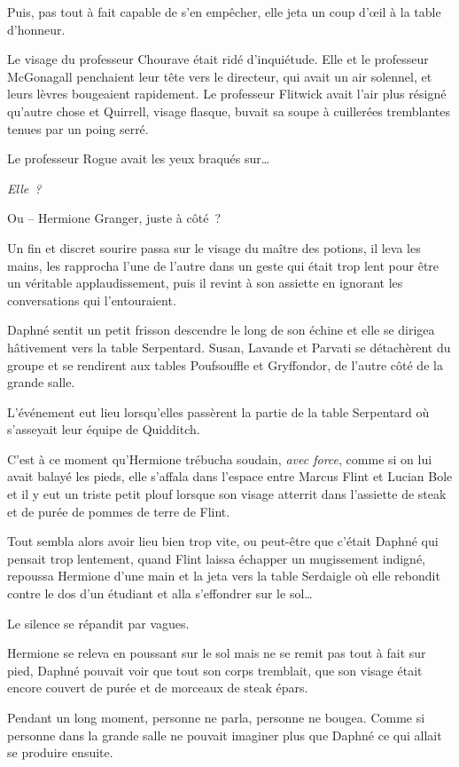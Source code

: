 Puis, pas tout à fait capable de s'en empêcher, elle jeta un coup d'œil à la table d'honneur.

Le visage du professeur Chourave était ridé d'inquiétude. Elle et le professeur McGonagall penchaient leur tête vers le directeur, qui avait un air solennel, et leurs lèvres bougeaient rapidement. Le professeur Flitwick avait l'air plus résigné qu'autre chose et Quirrell, visage flasque, buvait sa soupe à cuillerées tremblantes tenues par un poing serré.

Le professeur Rogue avait les yeux braqués sur…

\emph{Elle~?}

Ou -- Hermione Granger, juste à côté~?

Un fin et discret sourire passa sur le visage du maître des potions, il leva les mains, les rapprocha l'une de l'autre dans un geste qui était trop lent pour être un véritable applaudissement, puis il revint à son assiette en ignorant les conversations qui l'entouraient.

Daphné sentit un petit frisson descendre le long de son échine et elle se dirigea hâtivement vers la table Serpentard. Susan, Lavande et Parvati se détachèrent du groupe et se rendirent aux tables Poufsouffle et Gryffondor, de l'autre côté de la grande salle.

L'événement eut lieu lorsqu'elles passèrent la partie de la table Serpentard où s'asseyait leur équipe de Quidditch.

C'est à ce moment qu'Hermione trébucha soudain, \emph{avec force}, comme si on lui avait balayé les pieds, elle s'affala dans l'espace entre Marcus Flint et Lucian Bole et il y eut un triste petit plouf lorsque son visage atterrit dans l'assiette de steak et de purée de pommes de terre de Flint.

Tout sembla alors avoir lieu bien trop vite, ou peut-être que c'était Daphné qui pensait trop lentement, quand Flint laissa échapper un mugissement indigné, repoussa Hermione d'une main et la jeta vers la table Serdaigle où elle rebondit contre le dos d'un étudiant et alla s'effondrer sur le sol…

Le silence se répandit par vagues.

Hermione se releva en poussant sur le sol mais ne se remit pas tout à fait sur pied, Daphné pouvait voir que tout son corps tremblait, que son visage était encore couvert de purée et de morceaux de steak épars.

Pendant un long moment, personne ne parla, personne ne bougea. Comme si personne dans la grande salle ne pouvait imaginer plus que Daphné ce qui allait se produire ensuite.


